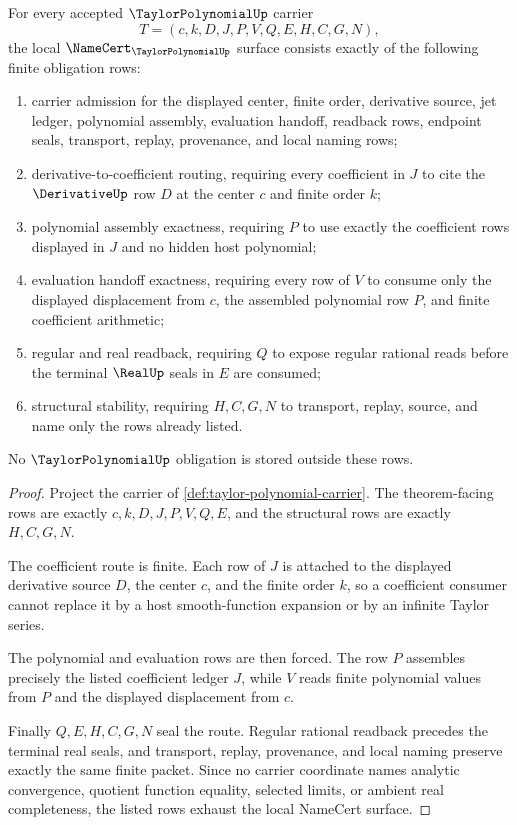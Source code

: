 \begin{theorem}
\label{thm:taylor-polynomial-namecert-obligations}
For every accepted $\TaylorPolynomialUp$ carrier
$$
T=(c,k,D,J,P,V,Q,E,H,C,G,N),
$$
the local $\NameCert_{\TaylorPolynomialUp}$ surface consists exactly of the following finite obligation rows:
\begin{enumerate}
\item carrier admission for the displayed center, finite order, derivative source, jet ledger, polynomial assembly, evaluation handoff, readback rows, endpoint seals, transport, replay, provenance, and local naming rows;
\item derivative-to-coefficient routing, requiring every coefficient in $J$ to cite the $\DerivativeUp$ row $D$ at the center $c$ and finite order $k$;
\item polynomial assembly exactness, requiring $P$ to use exactly the coefficient rows displayed in $J$ and no hidden host polynomial;
\item evaluation handoff exactness, requiring every row of $V$ to consume only the displayed displacement from $c$, the assembled polynomial row $P$, and finite coefficient arithmetic;
\item regular and real readback, requiring $Q$ to expose regular rational reads before the terminal $\RealUp$ seals in $E$ are consumed;
\item structural stability, requiring $H,C,G,N$ to transport, replay, source, and name only the rows already listed.
\end{enumerate}
No $\TaylorPolynomialUp$ obligation is stored outside these rows.
\end{theorem}
\begin{proof}
Project the carrier of \autoref{def:taylor-polynomial-carrier}. The theorem-facing rows are exactly $c,k,D,J,P,V,Q,E$, and the structural rows are exactly $H,C,G,N$.

The coefficient route is finite. Each row of $J$ is attached to the displayed derivative source $D$, the center $c$, and the finite order $k$, so a coefficient consumer cannot replace it by a host smooth-function expansion or by an infinite Taylor series.

The polynomial and evaluation rows are then forced. The row $P$ assembles precisely the listed coefficient ledger $J$, while $V$ reads finite polynomial values from $P$ and the displayed displacement from $c$.

Finally $Q,E,H,C,G,N$ seal the route. Regular rational readback precedes the terminal real seals, and transport, replay, provenance, and local naming preserve exactly the same finite packet. Since no carrier coordinate names analytic convergence, quotient function equality, selected limits, or ambient real completeness, the listed rows exhaust the local NameCert surface.
\end{proof}

